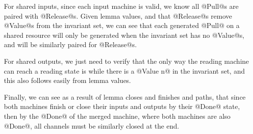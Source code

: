 For shared inputs, since each input machine is valid, we know all @Pull@s are paired with @Release@s.
Given lemma values, and that @Release@s remove @Value@s from the invariant set, we can see that each generated @Pull@ on a shared resource will only be generated when the invariant set has no @Value@s, and will be similarly paired for @Release@s.

For shared outputs, we just need to verify that the only way the reading machine can reach a reading state is while there is a @Value n@ in the invariant set, and this also follows easily from lemma values.

Finally, we can see as a result of lemma closes and finishes and paths, that since both machines finish or close their inputs and outputs by their @Done@ state, then by the @Done@ of the merged machine, where both machines are also @Done@, all channels must be similarly closed at the end.



